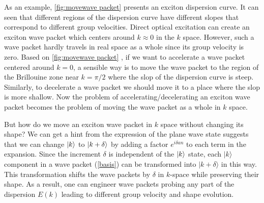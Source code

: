 As an example, \autoref{fig:movewave packet} presents an exciton dispersion curve. It can seen  that different
 regions of the dispersion curve have different slopes that correspond to different group velocities. 
Direct optical excitation can create an exciton wave packet which centers around $k\approx 0$ in the $k$ space. 
However, such a wave packet hardly travels in real space as a whole since its group velocity is zero. Based on 
\autoref{fig:movewave packet} , if we want to accelerate a  wave packet centered around $k = 0$, a sensible way is to move the 
wave packet to the region of the Brillouine zone near $k=\pi/2$ where the slop of the dispersion curve is steep. Similarly, to decelerate a
 wave packet we should move it to a place where the slop is more shallow. Now the problem of
accelerating/decelerating an exciton wave packet becomes the problem of moving the wave packet  as
a whole in $k$ space. 




But how do we move an exciton wave packet in $k$ space without changing its shape? We can get a hint from the
expression of the plane wave state
 suggests that we can change $| k \rangle$ to $| k+\delta \rangle$ by adding a
 factor $e^{i \delta a n}$ to each term in the expansion.  Since the increment $\delta$ is independent of the $| k \rangle$
state, 
each $| k\rangle$ component in a wave packet (\autoref{basis}) can be transformed into $|
k+\delta\rangle$ in this way. This transformation shifts the
wave packets by $\delta$ in $k$-space while preserving their
shape. As a result, one can engineer wave packets probing any part
of the dispersion $E(k)$ leading to different group velocity and
shape evolution. 

